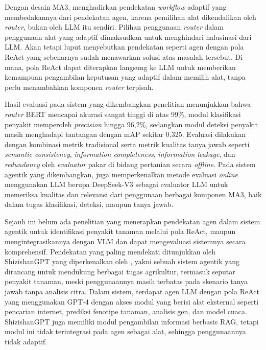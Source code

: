 Dengan desain MA3, \textcite{xuMultimodalAgriculturalAgent2025} menghadirkan pendekatan \textit{workflow} adaptif yang membedakannya dari pendekatan agen, karena pemilihan alat dikendalikan oleh \textit{router}, bukan oleh LLM itu sendiri. Pilihan penggunaan \textit{router} dalam penggunaan alat yang adaptif dimaksudkan untuk menghindari halusinasi dari LLM. Akan tetapi \citeauthor{xuMultimodalAgriculturalAgent2025} luput menyebutkan pendekatan seperti agen dengan pola ReAct yang sebenarnya sudah menawarkan solusi atas masalah tersebut. Di mana, pola ReAct dapat diterapkan langsung ke LLM untuk memberikan kemampuan pengambilan keputusan yang adaptif dalam memilih alat, tanpa perlu menambahkan komponen \textit{router} terpisah. 

Hasil evaluasi pada sistem yang dikembangkan penelitian \textcite{xuMultimodalAgriculturalAgent2025} menunjukkan bahwa \textit{router} BERT mencapai akurasi sangat tinggi di atas 99\%, modul klasifikasi penyakit memperoleh \textit{precision} hingga 96,2\%, sedangkan modul deteksi penyakit masih menghadapi tantangan dengan mAP sekitar 0,325. Evaluasi dilakukan dengan kombinasi metrik tradisional serta metrik kualitas tanya jawab seperti \textit{semantic consistency}, \textit{information completeness}, \textit{information leakage}, dan \textit{redundancy} oleh \textit{evaluator} pakar di bidang pertanian secara \textit{offline}. Pada sistem agentik yang dikembangkan, \textcite{xuMultimodalAgriculturalAgent2025} juga memperkenalkan metode evaluasi \textit{online} menggunakan LLM berupa DeepSeek-V3 sebagai evaluator LLM untuk memeriksa kualitas dan relevansi dari penggunaan berbagai komponen MA3, baik dalam tugas klasifikasi, deteksi, maupun tanya jawab.

Sejauh ini belum ada penelitian yang menerapkan pendekatan agen dalam sistem agentik untuk identifikasi penyakit tanaman melalui pola ReAct, maupun mengintegrasikannya dengan VLM dan dapat mengevaluasi sistemnya secara komprehensif. Pendekatan yang paling mendekati ditunjukkan oleh ShizishanGPT yang diperkenalkan oleh \textcite{yangShizishanGPTAgriculturalLarge2024}, yakni sebuah sistem agentik yang dirancang untuk mendukung berbagai tugas agrikultur, termasuk seputar penyakit tanaman, meski penggunaannya masih terbatas pada skenario tanya jawab tanpa analisis citra. Dalam sistem, terdapat agen LLM dengan pola ReAct yang menggunakan GPT-4 dengan akses modul yang berisi alat eksternal seperti pencarian internet, prediksi fenotipe tanaman, analisis gen, dan model cuaca. ShizishanGPT juga memiliki modul pengambilan informasi berbasis RAG, tetapi modul ini tidak terintegrasi pada agen sebagai alat, sehingga penggunaannya tidak adaptif. 

